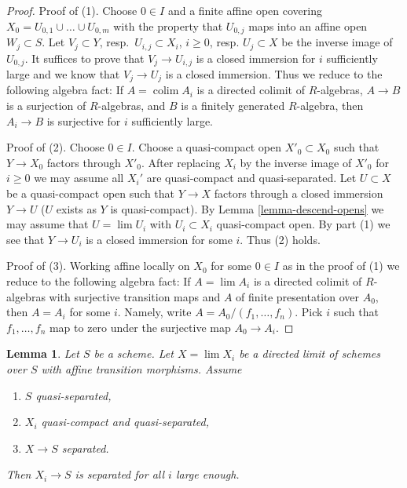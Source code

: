 \documentclass{stacks-project}
\theoremstyle{plain}
\newtheorem{lemma}[subsection]{Lemma}
\theoremstyle{definition}
\theoremstyle{remark}
\numberwithin{equation}{subsection}
\def\lim{\mathop{\mathrm{lim}}\nolimits}
\def\colim{\mathop{\mathrm{colim}}\nolimits}
\begin{document}
\begin{proof}
Proof of (1). Choose $0 \in I$ and a finite affine open covering
$X_0 = U_{0, 1} \cup \ldots \cup U_{0, m}$ with the property that
$U_{0, j}$ maps into an affine open $W_j \subset S$.
Let $V_j \subset Y$, resp.\ $U_{i, j} \subset X_i$, $i \geq 0$,
resp. $U_j \subset X$ be the inverse image of $U_{0, j}$. It suffices
to prove that $V_j \to U_{i, j}$ is a closed immersion for $i$
sufficiently large and we know that $V_j \to U_j$ is a closed immersion.
Thus we reduce to the following algebra fact: If $A = \colim A_i$ is a
directed colimit of $R$-algebras, $A \to B$ is a surjection of $R$-algebras,
and $B$ is a finitely generated $R$-algebra, then
$A_i \to B$ is surjective for $i$ sufficiently large.

\medskip\noindent
Proof of (2). Choose $0 \in I$. Choose a quasi-compact open
$X'_0 \subset X_0$ such that $Y \to X_0$ factors through $X'_0$.
After replacing $X_i$ by the inverse image of $X'_0$ for $i \geq 0$
we may assume all $X_i'$ are quasi-compact and quasi-separated.
Let $U \subset X$ be a quasi-compact open such that $Y \to X$ factors
through a closed immersion $Y \to U$ ($U$ exists as $Y$ is quasi-compact). By
Lemma \ref{lemma-descend-opens}
we may assume that $U = \lim U_i$ with $U_i \subset X_i$ quasi-compact
open. By part (1) we see that $Y \to U_i$ is a closed immersion for some
$i$. Thus (2) holds.

\medskip\noindent
Proof of (3). Working affine locally on $X_0$ for some $0 \in I$ as in
the proof of (1) we reduce to the following algebra fact: If $A = \lim A_i$
is a directed colimit of $R$-algebras with surjective transition
maps and $A$ of finite presentation over $A_0$, then $A = A_i$ for
some $i$. Namely, write $A = A_0/(f_1, \ldots, f_n)$. Pick $i$ such
that $f_1, \ldots, f_n$ map to zero under the surjective map $A_0 \to A_i$.
\end{proof}

\begin{lemma}
\label{lemma-eventually-separated}
Let $S$ be a scheme. Let $X = \lim X_i$ be a directed
limit of schemes over $S$ with affine transition morphisms.
Assume
\begin{enumerate}
\item $S$ quasi-separated,
\item $X_i$ quasi-compact and quasi-separated,
\item $X \to S$ separated.
\end{enumerate}
Then $X_i \to S$ is separated for all $i$ large enough.
\end{lemma}
\end{document}
